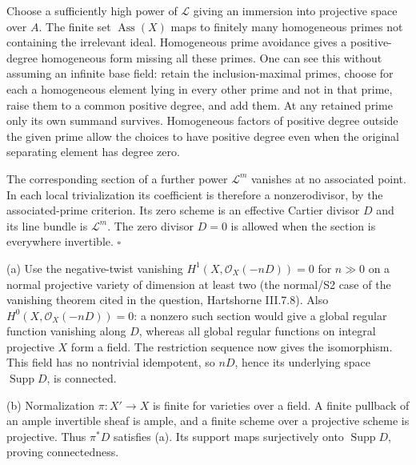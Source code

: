 \documentclass[11pt]{article}
\let\chapterexercise\exercise
\renewcommand{\exercise}[2]{\Needspace{8\baselineskip}\chapterexercise{#1}{#2}}
\begin{document}
\pf
Choose a sufficiently high power of $\mathcal L$ giving an immersion into projective space over $A$. The finite set $\operatorname{Ass}(X)$ maps to finitely many homogeneous primes not containing the irrelevant ideal. Homogeneous prime avoidance gives a positive-degree homogeneous form missing all these primes. One can see this without assuming an infinite base field: retain the inclusion-maximal primes, choose for each a homogeneous element lying in every other prime and not in that prime, raise them to a common positive degree, and add them. At any retained prime only its own summand survives. Homogeneous factors of positive degree outside the given prime allow the choices to have positive degree even when the original separating element has degree zero.

The corresponding section of a further power $\mathcal L^m$ vanishes at no associated point. In each local trivialization its coefficient is therefore a nonzerodivisor, by the associated-prime criterion. Its zero scheme is an effective Cartier divisor $D$ and its line bundle is $\mathcal L^m$. The zero divisor $D=0$ is allowed when the section is everywhere invertible. \hfill$\square$

\pf
(a) Use the negative-twist vanishing $H^1(X,\mathcal O_X(-nD))=0$ for $n\gg0$ on a normal projective variety of dimension at least two (the normal/S2 case of the vanishing theorem cited in the question, Hartshorne III.7.8). Also $H^0(X,\mathcal O_X(-nD))=0$: a nonzero such section would give a global regular function vanishing along $D$, whereas all global regular functions on integral projective $X$ form a field. The restriction sequence now gives the isomorphism. This field has no nontrivial idempotent, so $nD$, hence its underlying space $\operatorname{Supp}D$, is connected.

(b) Normalization $\pi:X'\to X$ is finite for varieties over a field. A finite pullback of an ample invertible sheaf is ample, and a finite scheme over a projective scheme is projective. Thus $\pi^*D$ satisfies (a). Its support maps surjectively onto $\operatorname{Supp}D$, proving connectedness.
\end{document}
